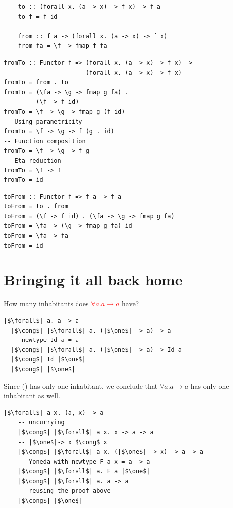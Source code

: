 \documentclass[tikz]{beamer}
\newcommand{\one}{\bm{\mathbb{1}}}
\newcommand{\mred}[1]{\textcolor{red}{$#1$}}
\theoremstyle{definition}
\begin{document}
\begin{frame}[fragile]
	\begin{verbatim}
	to :: (forall x. (a -> x) -> f x) -> f a
	to f = f id
	
	from :: f a -> (forall x. (a -> x) -> f x)
	from fa = \f -> fmap f fa
	\end{verbatim}
\end{frame}

\begin{frame}[fragile]
\begin{verbatim}
fromTo :: Functor f => (forall x. (a -> x) -> f x) ->
                       (forall x. (a -> x) -> f x)
fromTo = from . to
fromTo = (\fa -> \g -> fmap g fa) .
         (\f -> f id)
fromTo = \f -> \g -> fmap g (f id)
-- Using parametricity
fromTo = \f -> \g -> f (g . id)
-- Function composition
fromTo = \f -> \g -> f g
-- Eta reduction
fromTo = \f -> f
fromTo = id
\end{verbatim}
\end{frame}
\begin{frame}[fragile]
\begin{verbatim}
toFrom :: Functor f => f a -> f a
toFrom = to . from
toFrom = (\f -> f id) . (\fa -> \g -> fmap g fa)
toFrom = \fa -> (\g -> fmap g fa) id
toFrom = \fa -> fa
toFrom = id
\end{verbatim}
\end{frame}

\section{Bringing it all back home}


\frame
{
	How many inhabitants does \mred{\forall a. a \to a} have? 
}

\begin{frame}[fragile]

\begin{verbatim}
|$\forall$| a. a -> a
  |$\cong$| |$\forall$| a. (|$\one$| -> a) -> a
  -- newtype Id a = a
  |$\cong$| |$\forall$| a. (|$\one$| -> a) -> Id a
  |$\cong$| Id |$\one$|
  |$\cong$| |$\one$|
\end{verbatim}
Since () has only one inhabitant, we conclude that $\forall a. a \to a$ has only one inhabitant as well.
\end{frame}

\begin{frame}[fragile]
\begin{verbatim}
|$\forall$| a x. (a, x) -> a
    -- uncurrying
    |$\cong$| |$\forall$| a x. x -> a -> a
    -- |$\one$|-> x $\cong$ x
    |$\cong$| |$\forall$| a x. (|$\one$| -> x) -> a -> a
    -- Yoneda with newtype F a x = a -> a
    |$\cong$| |$\forall$| a. F a |$\one$|
    |$\cong$| |$\forall$| a. a -> a
    -- reusing the proof above
    |$\cong$| |$\one$|
\end{verbatim}
\end{frame}
\end{document}
